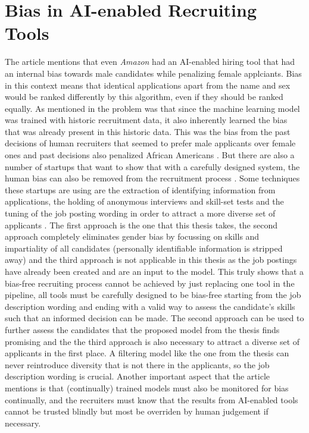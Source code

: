 \documentclass[draft,final]{thesisclass} %
\begin{document}
\section{Bias in \acs{AI}-enabled Recruiting Tools}
The article \textcite[9]{bias_ai_hiring} mentions that even \textit{Amazon} had an \acs{AI}-enabled hiring tool that had an internal bias towards male candidates while penalizing female applciants.
Bias in this context means that identical applications apart from the name and sex would be ranked differently by this algorithm, even if they should be ranked equally.
As mentioned in \textcite[9]{bias_ai_hiring} the problem was that since the machine learning model was trained with historic recruitment data, it also inherently learned the bias that was already present in this historic data.
This was the bias from the past decisions of human recruiters that seemed to prefer male applicants over female ones and past decisions also penalized African Americans \parencite[9-10]{bias_ai_hiring}.
But there are also a number of startups that want to show that with a carefully designed system, the human bias can also be removed from the recruitment process \parencite[9]{bias_ai_hiring}.
Some techniques these startups are using are the extraction of identifying information from applications, the holding of anonymous interviews and skill-set tests and the tuning of the job posting wording in order to attract a more diverse set of applicants \parencite[9]{bias_ai_hiring}.
The first approach is the one that this thesis takes, the second approach completely eliminates gender bias by focussing on skills and impartiality of all candidates (personally identifiable information is stripped away) and the third approach is not applicable in this thesis as the job postings have already been created and are an input to the model.
This truly shows that a bias-free recruiting process cannot be achieved by just replacing one tool in the pipeline, all tools must be carefully designed to be bias-free starting from the job description wording and ending with a valid way to assess the candidate's skills such that an informed decision can be made.
The second approach can be used to further assess the candidates that the proposed model from the thesis finds promising and the the third approach is also necessary to attract a diverse set of applicants in the first place.
A filtering model like the one from the thesis can never reintroduce diversity that is not there in the applicants, so the job description wording is crucial.
Another important aspect that the article \textcite[9-10]{bias_ai_hiring} mentions is that (continually) trained models must also be monitored for bias continually, and the recruiters must know that the results from \acs{AI}-enabled tools cannot be trusted blindly but most be overriden by human judgement if necessary.
\end{document}
